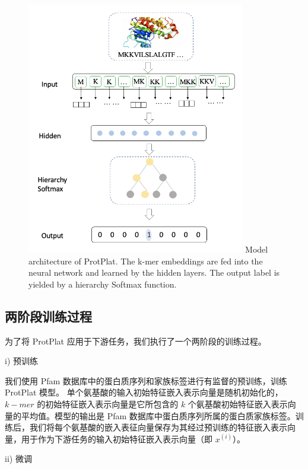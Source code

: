 \begin{figure}[!htp] 
\centering
\includegraphics[width=0.85\textwidth]  {imgs/protplat.png}
        {Model architecture of ProtPlat. The k-mer embeddings are fed into the neural network and learned by the hidden layers. The output label is yielded by a hierarchy Softmax function. }
\label{fig:protplat}
\end{figure}

\subsection{两阶段训练过程}
为了将 ProtPlat 应用于下游任务，我们执行了一个两阶段的训练过程。

i) 预训练

我们使用 Pfam 数据库中的蛋白质序列和家族标签进行有监督的预训练，训练 ProtPlat 模型。 单个氨基酸的输入初始特征嵌入表示向量是随机初始化的，$k-mer$ 的初始特征嵌入表示向量是它所包含的 $k$ 个氨基酸初始特征嵌入表示向量的平均值。模型的输出是 Pfam 数据库中蛋白质序列所属的蛋白质家族标签。训练后，我们将每个氨基酸的嵌入表征向量保存为其经过预训练的特征嵌入表示向量，用于作为下游任务的输入初始特征嵌入表示向量（即 $x^{(i)}$）。

ii) 微调

